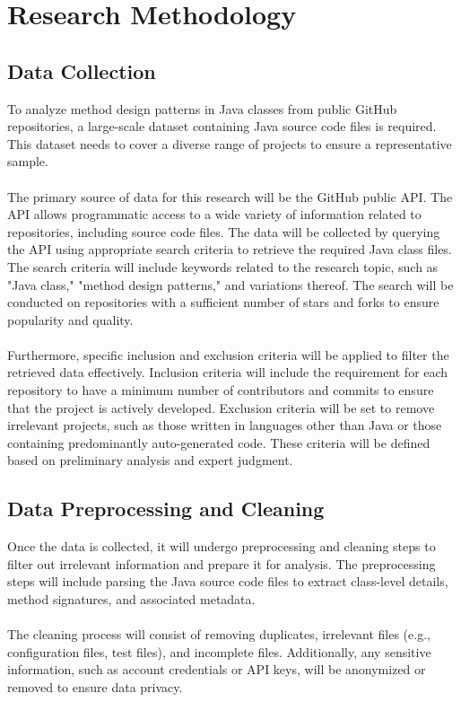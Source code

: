 \documentclass[draft]{article}
\begin{document}
\newpage
\section{Research Methodology}
\subsection{Data Collection}
To analyze method design patterns in Java classes from public GitHub repositories, a large-scale dataset containing Java source code files is required. This dataset needs to cover a diverse range of projects to ensure a representative sample.\\
~\\
The primary source of data for this research will be the GitHub public API. The API allows programmatic access to a wide variety of information related to repositories, including source code files. The data will be collected by querying the API using appropriate search criteria to retrieve the required Java class files. The search criteria will include keywords related to the research topic, such as "{}Java class,"{} "{}method design patterns,"{} and variations thereof. The search will be conducted on repositories with a sufficient number of stars and forks to ensure popularity and quality.\\
~\\
Furthermore, specific inclusion and exclusion criteria will be applied to filter the retrieved data effectively. Inclusion criteria will include the requirement for each repository to have a minimum number of contributors and commits to ensure that the project is actively developed. Exclusion criteria will be set to remove irrelevant projects, such as those written in languages other than Java or those containing predominantly auto-generated code. These criteria will be defined based on preliminary analysis and expert judgment.
\subsection{Data Preprocessing and Cleaning}
Once the data is collected, it will undergo preprocessing and cleaning steps to filter out irrelevant information and prepare it for analysis. The preprocessing steps will include parsing the Java source code files to extract class-level details, method signatures, and associated metadata.\\
~\\
The cleaning process will consist of removing duplicates, irrelevant files (e.g., configuration files, test files), and incomplete files. Additionally, any sensitive information, such as account credentials or API keys, will be anonymized or removed to ensure data privacy.
\end{document}
